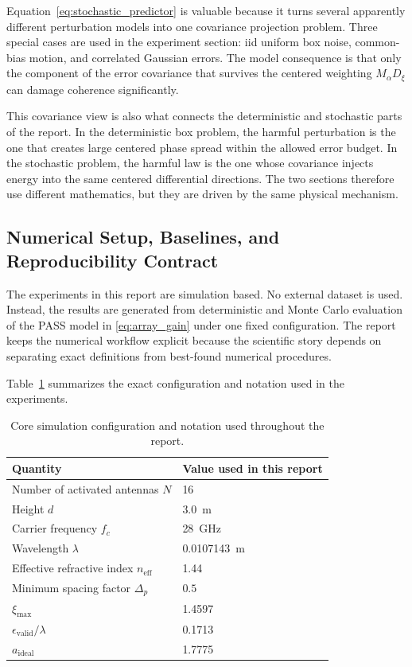 Equation~\eqref{eq:stochastic_predictor} is valuable because it turns several apparently different perturbation models into one covariance projection problem. Three special cases are used in the experiment section: iid uniform box noise, common-bias motion, and correlated Gaussian errors. The model consequence is that only the component of the error covariance that survives the centered weighting $M_\alpha D_\xi$ can damage coherence significantly.

This covariance view is also what connects the deterministic and stochastic parts of the report. In the deterministic box problem, the harmful perturbation is the one that creates large centered phase spread within the allowed error budget. In the stochastic problem, the harmful law is the one whose covariance injects energy into the same centered differential directions. The two sections therefore use different mathematics, but they are driven by the same physical mechanism.

\subsection{Numerical Setup, Baselines, and Reproducibility Contract}

The experiments in this report are simulation based. No external dataset is used. Instead, the results are generated from deterministic and Monte Carlo evaluation of the PASS model in \eqref{eq:array_gain} under one fixed configuration. The report keeps the numerical workflow explicit because the scientific story depends on separating exact definitions from best-found numerical procedures.

Table~\ref{tab:config} summarizes the exact configuration and notation used in the experiments.

\begin{table}[H]
\centering
\caption{Core simulation configuration and notation used throughout the report.}
\label{tab:config}
\begin{tabular}{ll}
\toprule
Quantity & Value used in this report \\
\midrule
Number of activated antennas $N$ & 16 \\
Height $d$ & \SI{3.0}{m} \\
Carrier frequency $f_c$ & \SI{28}{GHz} \\
Wavelength $\lambda$ & \SI{0.0107143}{m} \\
Effective refractive index $n_{\mathrm{eff}}$ & 1.44 \\
Minimum spacing factor $\Delta_p$ & $0.5$ \\
$\xi_{\max}$ & 1.4597 \\
$\epsilon_{\mathrm{valid}}/\lambda$ & 0.1713 \\
$a_{\mathrm{ideal}}$ & 1.7775 \\
\bottomrule
\end{tabular}
\end{table}

